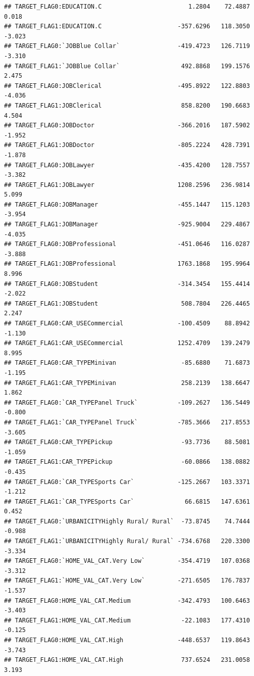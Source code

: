 \documentclass[
]{article}
\begin{document}
\begin{verbatim}
## TARGET_FLAG0:EDUCATION.C                        1.2804    72.4887   0.018
## TARGET_FLAG1:EDUCATION.C                     -357.6296   118.3050  -3.023
## TARGET_FLAG0:`JOBBlue Collar`                -419.4723   126.7119  -3.310
## TARGET_FLAG1:`JOBBlue Collar`                 492.8868   199.1576   2.475
## TARGET_FLAG0:JOBClerical                     -495.8922   122.8803  -4.036
## TARGET_FLAG1:JOBClerical                      858.8200   190.6683   4.504
## TARGET_FLAG0:JOBDoctor                       -366.2016   187.5902  -1.952
## TARGET_FLAG1:JOBDoctor                       -805.2224   428.7391  -1.878
## TARGET_FLAG0:JOBLawyer                       -435.4200   128.7557  -3.382
## TARGET_FLAG1:JOBLawyer                       1208.2596   236.9814   5.099
## TARGET_FLAG0:JOBManager                      -455.1447   115.1203  -3.954
## TARGET_FLAG1:JOBManager                      -925.9004   229.4867  -4.035
## TARGET_FLAG0:JOBProfessional                 -451.0646   116.0287  -3.888
## TARGET_FLAG1:JOBProfessional                 1763.1868   195.9964   8.996
## TARGET_FLAG0:JOBStudent                      -314.3454   155.4414  -2.022
## TARGET_FLAG1:JOBStudent                       508.7804   226.4465   2.247
## TARGET_FLAG0:CAR_USECommercial               -100.4509    88.8942  -1.130
## TARGET_FLAG1:CAR_USECommercial               1252.4709   139.2479   8.995
## TARGET_FLAG0:CAR_TYPEMinivan                  -85.6880    71.6873  -1.195
## TARGET_FLAG1:CAR_TYPEMinivan                  258.2139   138.6647   1.862
## TARGET_FLAG0:`CAR_TYPEPanel Truck`           -109.2627   136.5449  -0.800
## TARGET_FLAG1:`CAR_TYPEPanel Truck`           -785.3666   217.8553  -3.605
## TARGET_FLAG0:CAR_TYPEPickup                   -93.7736    88.5081  -1.059
## TARGET_FLAG1:CAR_TYPEPickup                   -60.0866   138.0882  -0.435
## TARGET_FLAG0:`CAR_TYPESports Car`            -125.2667   103.3371  -1.212
## TARGET_FLAG1:`CAR_TYPESports Car`              66.6815   147.6361   0.452
## TARGET_FLAG0:`URBANICITYHighly Rural/ Rural`  -73.8745    74.7444  -0.988
## TARGET_FLAG1:`URBANICITYHighly Rural/ Rural` -734.6768   220.3300  -3.334
## TARGET_FLAG0:`HOME_VAL_CAT.Very Low`         -354.4719   107.0368  -3.312
## TARGET_FLAG1:`HOME_VAL_CAT.Very Low`         -271.6505   176.7837  -1.537
## TARGET_FLAG0:HOME_VAL_CAT.Medium             -342.4793   100.6463  -3.403
## TARGET_FLAG1:HOME_VAL_CAT.Medium              -22.1083   177.4310  -0.125
## TARGET_FLAG0:HOME_VAL_CAT.High               -448.6537   119.8643  -3.743
## TARGET_FLAG1:HOME_VAL_CAT.High                737.6524   231.0058   3.193

\end{verbatim}
\end{document}
